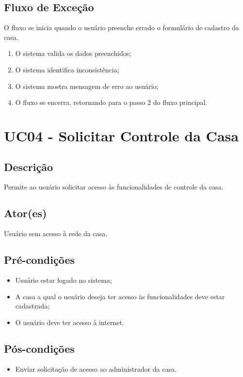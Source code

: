     \subsection{Fluxo de Exceção}
        O fluxo se inicia quando o usuário preenche errado o formulário de cadastro da casa.
        \begin{enumerate}
            \item O sistema valida os dados preenchidos;
            \item O sistema identifica inconsistência;
            \item O sistema mostra mensagem de erro ao usuário;
            \item O fluxo se encerra, retornando para o passo 2 do fluxo principal.
        \end{enumerate}

\section{UC04 \-- Solicitar Controle da Casa}
    \subsection{Descrição}
        Permite ao usuário solicitar acesso às funcionalidades de controle da casa.
    \subsection{Ator(es)}
        Usuário sem acesso à rede da casa.
    \subsection{Pré-condições}
        \begin{itemize}
            \item Usuário estar logado no sistema;
            \item A casa a qual o usuário deseja ter acesso às funcionalidades deve estar cadastrada;
            \item O usuário deve ter acesso à internet.
        \end{itemize}
    \subsection{Pós-condições}
        \begin{itemize}
            \item Enviar solicitação de acesso ao administrador da casa.
        \end{itemize}
